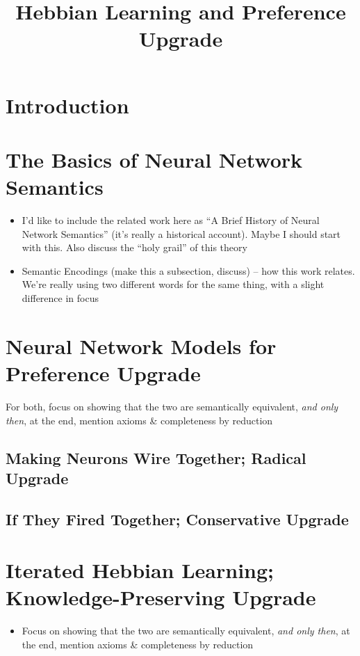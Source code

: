\documentclass[letterpaper]{article}
\title{Hebbian Learning and Preference Upgrade}
\date{}
\theoremstyle{definition}
\begin{document}
\maketitle

\section{Introduction}

\section{The Basics of Neural Network Semantics}

\begin{itemize}
    \item I'd like to include the related work here as ``A Brief History of Neural Network Semantics'' (it's really a historical account).  Maybe I should start with this.  Also discuss the ``holy grail'' of this theory
    \item Semantic Encodings (make this a subsection, discuss) -- how this work relates.  We're really using two different words for the same thing, with a slight difference in focus
\end{itemize}

\section{Neural Network Models for Preference Upgrade}

For both, focus on showing that the two are semantically equivalent, \textit{and only then}, at the end, mention axioms \& completeness by reduction

\subsection{Making Neurons Wire Together; Radical Upgrade}

\subsection{If They Fired Together; Conservative Upgrade}


\section{Iterated Hebbian Learning; Knowledge-Preserving Upgrade}

\begin{itemize}
    \item Focus on showing that the two are semantically equivalent, \textit{and only then}, at the end, mention axioms \& completeness by reduction
\end{itemize}
\end{document}
